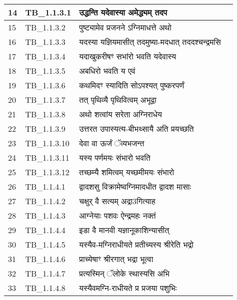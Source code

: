 \documentclass[17pt]{extarticle}
\begin{document}
\begin{longtable}{||p{0.4in}||p{0.9in}||p{4.0in}||p{0.9in}||}
        \hline
            14 & TB\_1.1.3.1 & उद्धन्ति यदेवास्या अमेद्ध्यम् तदप &      \\
        \hline
            15 & TB\_1.1.3.2 & पुष्ट्यामेव प्रजनने ऽग्निमाधत्ते अथो &      \\
        \hline
            16 & TB\_1.1.3.3 & यदस्या यज्ञियमासीत् तदमुष्या{-}मदधात् तददश्चन्द्रमसि &      \\
        \hline
            17 & TB\_1.1.3.4 & यदाखुकरीषꣳ सभांरो भवति यदेवास्य &      \\
        \hline
            18 & TB\_1.1.3.5 & अबधिरो भवति य एवं &      \\
        \hline
            19 & TB\_1.1.3.6 & कथमिदꣳ स्यादिति सोऽपश्यत् पुष्करपर्णं &      \\
        \hline
            20 & TB\_1.1.3.7 & तत् पृथिव्यै पृथिवित्वम् अभूद्वा &      \\
        \hline
            21 & TB\_1.1.3.8 & अथो शत्वांय सरेता अग्निराधेय &      \\
        \hline
            22 & TB\_1.1.3.9 & उत्तरत उपास्यत्य{-}बीभथ्सायै अति प्रयच्छति &      \\
        \hline
            23 & TB\_1.1.3.10 & देवा वा ऊर्जं ॅव्यभजन्त &      \\
        \hline
            24 & TB\_1.1.3.11 & यस्य पर्णमयः संभारो भवति &      \\
        \hline
            25 & TB\_1.1.3.12 & तच्छम्यै शमित्वम् यच्छमीमयः संभारो &      \\
        \hline
            26 & TB\_1.1.4.1 & द्वादशसु विक्रामेष्वग्निमादधीत द्वादश मासाः &      \\
        \hline
            27 & TB\_1.1.4.2 & चक्षुर् वै सत्यम् अद्रा3गित्याह &      \\
        \hline
            28 & TB\_1.1.4.3 & आग्नेयाः पशवः ऐन्द्रमहः नक्तं &      \\
        \hline
            29 & TB\_1.1.4.4 & इडा वै मानवी यज्ञानूकाशिन्यासीत् &      \\
        \hline
            30 & TB\_1.1.4.5 & यस्यैव{-}मग्निराधीयते प्रतीच्यस्य श्रीरेति भद्रो &      \\
        \hline
            31 & TB\_1.1.4.6 & प्राच्येषाꣳ श्रीरगात् भद्रा भूत्वा &      \\
        \hline
            32 & TB\_1.1.4.7 & प्रत्यस्मिन् ॅलोके स्थास्यसि अभि &      \\
        \hline
            33 & TB\_1.1.4.8 & यस्यैवमग्नि{-}राधीयते प्र प्रजया पशुभिः &      \\

\end{longtable}
\end{document}
